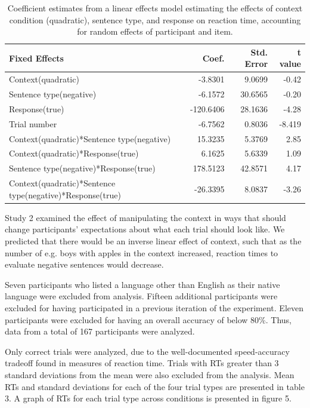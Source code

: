 \documentclass[man]{apa2}
\begin{document}
\begin{table}
\centering
\setlength{\tabcolsep}{10pt}
\begin{tabular}{ l  r  r  r  } 
\hline
  \bf{Fixed Effects} & \bf{Coef.} & \bf{Std. Error} & \bf{t value} \\ \hline \hline                       
Context(quadratic) &-3.8301 & 9.0699 & -0.42\\
\hline
Sentence type(negative) &  -6.1572 & 30.6565 & -0.20\\
\hline
Response(true) & -120.6406 &   28.1636 &  -4.28\\
\hline
Trial number & -6.7562   &  0.8036  & -8.419\\
\hline
Context(quadratic)*Sentence type(negative)&15.3235  &   5.3769  &  2.85\\
\hline
Context(quadratic)*Response(true) & 6.1625  &   5.6339  &  1.09\\
\hline
Sentence type(negative)*Response(true) &  178.5123 &   42.8571  &  4.17\\
\hline
Context(quadratic)*Sentence type(negative)*Response(true) & -26.3395  &   8.0837 &  -3.26\\
\hline
\hline
\end{tabular}
\caption{Coefficient estimates from a linear effects model estimating the effects of context condition (quadratic), sentence type, and response on reaction time, accounting for random effects of participant and item.}
\end{table}


Study 2 examined the effect of manipulating the context in ways that should change participants' expectations about what each trial should look like.  We predicted that there would be an inverse linear effect of context, such that as the number of e.g. boys with apples in the context increased, reaction times to evaluate negative sentences would decrease.  

Seven participants who listed a language other than English as their native language were excluded from analysis.  Fifteen additional participants were excluded for having participated in a previous iteration of the experiment.  Eleven participants were excluded for having an overall accuracy of below 80\%.  Thus, data from a total of 167 participants were analyzed.  

Only correct trials were analyzed, due to the well-documented speed-accuracy tradeoff found in measures of reaction time.  Trials with RTs greater than 3 standard deviations from the mean were also excluded from the analysis.  Mean RTs and standard deviations for each of the four trial types are presented in table 3.  A graph of RTs for each trial type across conditions is presented in figure 5.  
\end{document}

